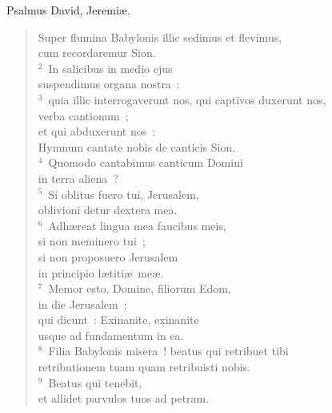 \bchapter
\lettrine[lines=3,image=true,loversize=0.05,lraise=-0.03]{P}{}salmus David, Jeremi\ae . \begin{flushleft}\begin{verse}\vspace{6pt}Super flumina Babylonis illic sedimus et flevimus,\\ cum recordaremur Sion.\\
${}^{2}$~In salicibus in medio ejus\\ suspendimus organa nostra~:\\
${}^{3}$~quia illic interrogaverunt nos, qui captivos duxerunt nos,\\ verba cantionum~;\\ et qui abduxerunt nos~:\\ Hymnum cantate nobis de canticis Sion.\\
${}^{4}$~Quomodo cantabimus canticum Domini\\ in terra aliena~?\\
${}^{5}$~Si oblitus fuero tui, Jerusalem,\\ oblivioni detur dextera mea.\\
${}^{6}$~Adh\ae reat lingua mea faucibus meis,\\ si non meminero tui~;\\ si non proposuero Jerusalem\\ in principio l\ae titi\ae\ me\ae .\\
${}^{7}$~Memor esto, Domine, filiorum Edom,\\ in die Jerusalem~:\\ qui dicunt~: Exinanite, exinanite\\ usque ad fundamentum in ea.\\
${}^{8}$~Filia Babylonis misera~! beatus qui retribuet tibi\\ retributionem tuam quam retribuisti nobis.\\
${}^{9}$~Beatus qui tenebit,\\ et allidet parvulos tuos ad petram.\end{verse}\end{flushleft}



